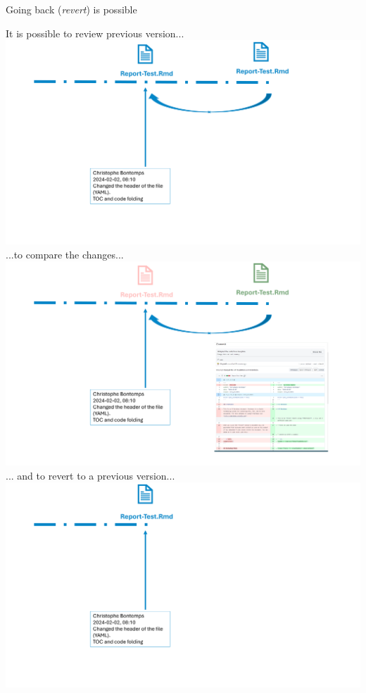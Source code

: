 \documentclass[xcolor=x11names,compress, aspectratio=169]{beamer}
\renewcommand{\(}{\begin{columns}}
\renewcommand{\)}{\end{columns}}
\newcommand{\<}[1]{\begin{column}{#1}}
\renewcommand{\>}{\end{column}}
\begin{document}
\begin{frame}{Going back (\emph{revert}) is possible}
\begin{center}
\begin{itemize}
    {It is possible to review previous version... \\ }
    {\includegraphics[width = 1.0\textwidth]{FileLifeBack.png} \\ }
    {...to compare the changes...  }
    {\includegraphics[width = 1.0\textwidth]{FileLifeDiff.png} \\ }
    {... and to revert  to a  previous version... }
    {\includegraphics[width = 1.0\textwidth]{FileLifeRevert.png} \\ }

\end{itemize}
\end{center}
\end{frame}
\end{document}

